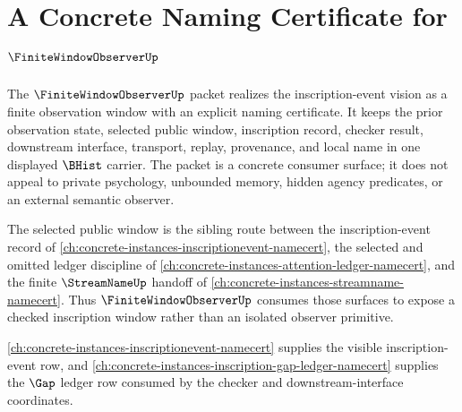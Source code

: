 \chapter{A Concrete Naming Certificate for $\FiniteWindowObserverUp$}
\label{ch:concrete-instances-finitewindowobserver-namecert}

The $\FiniteWindowObserverUp$ packet realizes the inscription-event vision as a finite observation window with an explicit naming certificate. It keeps the prior observation state, selected public window, inscription record, checker result, downstream interface, transport, replay, provenance, and local name in one displayed $\BHist$ carrier. The packet is a concrete consumer surface; it does not appeal to private psychology, unbounded memory, hidden agency predicates, or an external semantic observer.

The selected public window is the sibling route between the inscription-event record of \autoref{ch:concrete-instances-inscriptionevent-namecert}, the selected and omitted ledger discipline of \autoref{ch:concrete-instances-attention-ledger-namecert}, and the finite $\StreamNameUp$ handoff of \autoref{ch:concrete-instances-streamname-namecert}. Thus $\FiniteWindowObserverUp$ consumes those surfaces to expose a checked inscription window rather than an isolated observer primitive.

\autoref{ch:concrete-instances-inscriptionevent-namecert} supplies the visible inscription-event row, and \autoref{ch:concrete-instances-inscription-gap-ledger-namecert} supplies the $\Gap$ ledger row consumed by the checker and downstream-interface coordinates.

